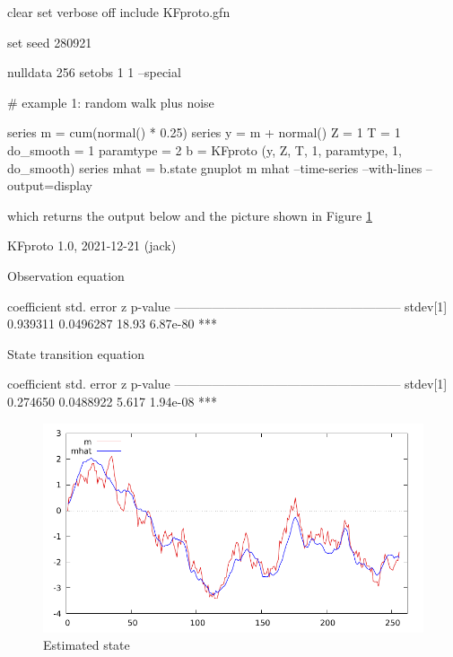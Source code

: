 \documentclass[a4paper]{article}
\begin{document}
\begin{code}
clear
set verbose off
include KFproto.gfn

set seed 280921

nulldata 256
setobs 1 1 --special

# example 1: random walk plus noise

series m = cum(normal() * 0.25)
series y = m + normal()
Z = {1}
T = {1}
do_smooth = 1
paramtype = 2
b = KFproto (y, Z, T, 1, paramtype, 1, do_smooth)
series mhat = b.state
gnuplot m mhat --time-series --with-lines --output=display
\end{code}

which returns the output below and the picture shown in Figure
\ref{fig:state}

\begin{code}
KFproto 1.0, 2021-12-21 (jack)

Observation equation

             coefficient   std. error     z     p-value 
  ------------------------------------------------------
  stdev[1]    0.939311     0.0496287    18.93   6.87e-80 ***


State transition equation

             coefficient   std. error     z     p-value 
  ------------------------------------------------------
  stdev[1]    0.274650     0.0488922    5.617   1.94e-08 ***
\end{code}


\begin{figure}[hb]
  \centering
  \includegraphics[scale=0.7]{state}
  \caption{Estimated state}\label{fig:state}
\end{figure}
\end{document}
